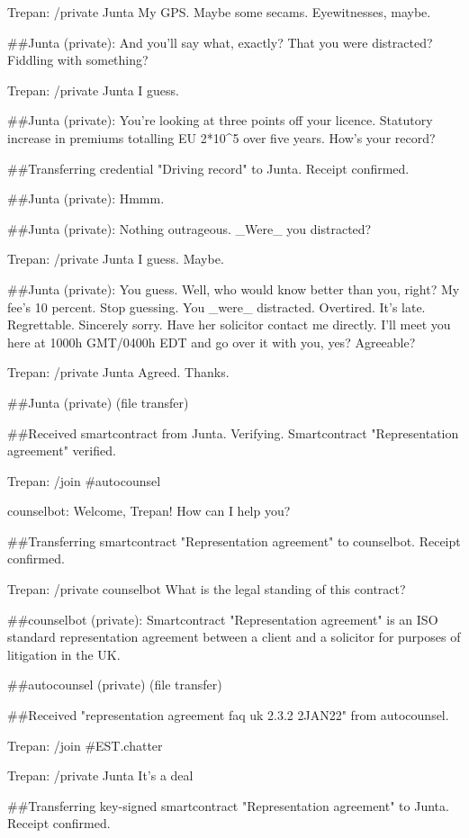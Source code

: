Trepan: /private Junta My GPS. Maybe some secams. Eyewitnesses,
maybe.

\#\#Junta (private): And you'll say what, exactly? That you were
distracted? Fiddling with something?

Trepan: /private Junta I guess.

\#\#Junta (private): You're looking at three points off your
licence. Statutory increase in premiums totalling EU 2*10\^{}5 over
five years. How's your record?

\#\#Transferring credential "Driving record" to Junta. Receipt
confirmed.

\#\#Junta (private): Hmmm.

\#\#Junta (private): Nothing outrageous. \_Were\_ you distracted?

Trepan: /private Junta I guess. Maybe.

\#\#Junta (private): You guess. Well, who would know better than
you, right? My fee's 10 percent. Stop guessing. You \_were\_
distracted. Overtired. It's late. Regrettable. Sincerely sorry.
Have her solicitor contact me directly. I'll meet you here at 1000h
GMT/0400h EDT and go over it with you, yes? Agreeable?

Trepan: /private Junta Agreed. Thanks.

\#\#Junta (private) (file transfer)

\#\#Received smartcontract from Junta. Verifying. Smartcontract
"Representation agreement" verified.

Trepan: /join \#autocounsel

counselbot: Welcome, Trepan! How can I help you?

\#\#Transferring smartcontract "Representation agreement" to
counselbot. Receipt confirmed.

Trepan: /private counselbot What is the legal standing of this
contract?

\#\#counselbot (private): Smartcontract "Representation agreement"
is an ISO standard representation agreement between a client and a
solicitor for purposes of litigation in the UK.

\#\#autocounsel (private) (file transfer)

\#\#Received "representation agreement faq uk 2.3.2 2JAN22" from
autocounsel.

Trepan: /join \#EST.chatter

Trepan: /private Junta It's a deal

\#\#Transferring key-signed smartcontract "Representation
agreement" to Junta. Receipt confirmed.

